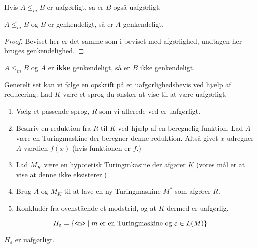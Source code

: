 \begin{corollary}
	Hvis $A \leq _{m}B$ er uafgørligt, så er $B$ også uafgørligt.
\end{corollary}

\begin{theorem}
	$A \leq_{m} B$ og $B$ er genkendeligt, så er $A$ genkendeligt.
\end{theorem}

\begin{proof}
Beviset her er det samme som i beviset med afgørlighed, undtagen her bruges genkendelighed.
\end{proof}

\begin{corollary}
	$A \leq_m B$ og $A$ er \textbf{ikke} genkendeligt, så er $B$ ikke genkendeligt.
\end{corollary}


Generelt set kan vi følge en opskrift på et uafgørlighedsbevis ved hjælp af reducering:
Lad $K$ være et sprog du ønsker at vise til at være uafgørligt.
\begin{enumerate}

  \item Vælg et passende sprog, $R$ som vi allerede ved er uafgørligt.
  \item Beskriv en reduktion fra $R$ til $K$ ved hjælp af en beregnelig funktion. Lad $A$ være en Turingmaskine der beregner denne reduktion. Altså givet $x$ udregner $A$ værdien $f(x)$ (hvis funktionen er $f$.)
  \item Lad $M_{K}$ være en hypotetisk Turingmkasine der afgører $K$ (vores mål er at vise at denne ikke eksisterer.)
  \item Brug $A$ og $M_{K}$ til at lave en ny Turingmaskine $M^{*}$ som afgører $R$.
  \item Konkludér fra ovenstående et modstrid, og at $K$ dermed er uafgørlig.
\end{enumerate}



\begin{equation*}
	H_{\varepsilon} = \{\text{\texttt{<m>}} \mid m \text{ er en Turingmaskine og } \varepsilon \in L(M)\}
\end{equation*}

\begin{theorem}
	$H_{\varepsilon}$ er uafgørligt.
\end{theorem}


